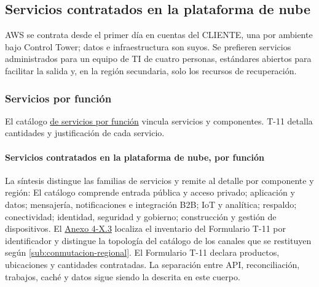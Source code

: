 %

\subsection{Servicios contratados en la plataforma de nube}
\label{fuente-02-b-servicios-nube}
\label{sec:servicios-nube}

AWS se contrata desde el primer día en cuentas del CLIENTE, una por ambiente bajo Control Tower; datos e infraestructura son suyos. Se prefieren servicios administrados para un equipo de TI de cuatro personas, estándares abiertos para facilitar la salida y, en la región secundaria, solo los recursos de recuperación.

\subsubsection{Servicios por función}

El catálogo \hyperref[tab:servicios-nube]{de servicios por función} vincula servicios y componentes. T-11 detalla cantidades y justificación de cada servicio.

\paragraph*{Servicios contratados en la plataforma de nube, por función}
\label{tab:servicios-nube}
La síntesis distingue las familias de servicios y remite al detalle por componente y región:
El catálogo comprende entrada pública y acceso privado; aplicación y datos; mensajería, notificaciones e integración B2B; IoT y analítica; respaldo; conectividad; identidad, seguridad y gobierno; construcción y gestión de dispositivos. El \href{LAFROX-Subdocumento4-Anexos.pdf#anx:X-servicios}{Anexo 4-X.3} localiza el inventario del Formulario T-11 por identificador y distingue la topología del catálogo de los canales que se restituyen según \ref{sub:conmutacion-regional}. El Formulario T-11 declara productos, ubicaciones y cantidades contratadas. La separación entre API, reconciliación, trabajos, caché y datos sigue siendo la descrita en este cuerpo.

